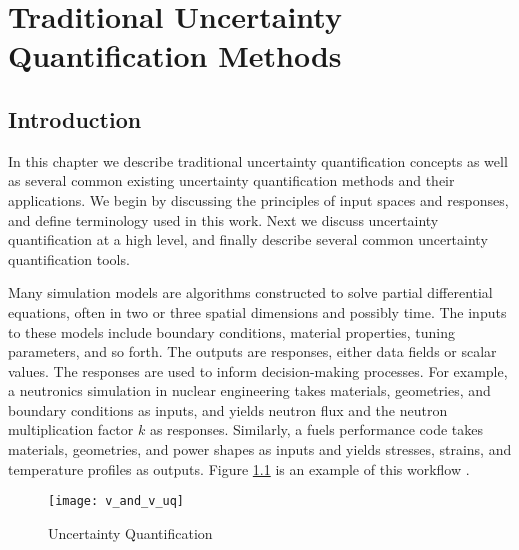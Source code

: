 
\chapter{Traditional Uncertainty Quantification Methods} %

\label{ch:methods basic} %



\section{Introduction}
In this chapter we describe traditional uncertainty quantification concepts as well as several common existing
uncertainty quantification methods and their applications.
We begin
by discussing the principles of input spaces and responses, and define terminology used in this work.  Next we
discuss uncertainty quantification at a high level, and finally describe several common uncertainty quantification
tools.

Many simulation models are algorithms constructed to solve partial differential equations, often in two or
three spatial dimensions and possibly time.  The inputs to these models include boundary conditions, material
properties, tuning parameters, and so forth.  The outputs are responses, either data fields or
scalar values.  The responses are used to inform decision-making processes.  For example, a neutronics
simulation in nuclear engineering takes materials, geometries, and boundary conditions as inputs, and yields
neutron flux and the neutron multiplication factor $k$ as responses.  Similarly, a fuels performance code
takes materials, geometries, and power shapes as inputs and yields stresses, strains, and temperature profiles
as outputs.  Figure \ref{fig:ober} is an example of this workflow \cite{oberkampf}.
\begin{figure}
  \centering
  \texttt{[image: v\_and\_v\_uq]}
  \caption{Uncertainty Quantification \cite{oberkampf}}
  \label{fig:ober}
\end{figure}

